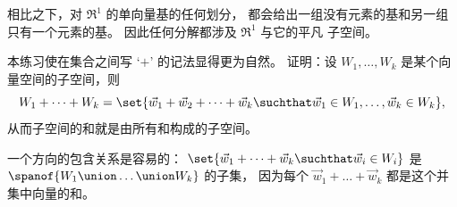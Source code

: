 \begin{exercises}
\begin{answer}
      相比之下，对 \( \Re^1 \) 的单向量基的任何划分，
      都会给出一组没有元素的基和另一组只有一个元素的基。
      因此任何分解都涉及 \( \Re^1 \) 与它的平凡
      子空间。 
    \end{answer}
  \item 
      本练习使在集合之间写 `$+$' 的记法显得更为自然。 
      证明：设 \( W_1,\dots, W_k \) 是某个向量空间的子空间，则
      \begin{equation*}
        W_1+\dots+W_k
        =\set{\vec{w}_1+\vec{w}_2+\dots+\vec{w}_k
              \suchthat \vec{w}_1\in W_1,\dots,\vec{w}_k\in W_k},
      \end{equation*}
      从而子空间的和就是由所有和构成的子空间。
      \begin{answer}
        一个方向的包含关系是容易的：
        \( \set{\vec{w}_1+\dots+\vec{w}_k\suchthat \vec{w}_i\in W_i} \)
        是 \( \spanof{W_1\union \dots \union W_k}  \) 的子集，
        因为每个 \( \vec{w}_1+\dots+\vec{w}_k \) 都是这个并集中向量的和。


\end{answer}
\end{exercises}

